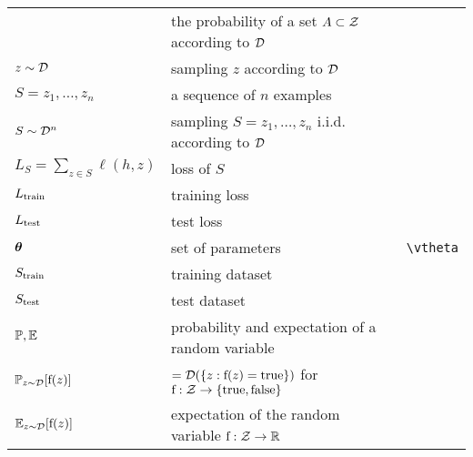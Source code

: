 \documentclass[]{report}
\begin{document}
\begin{center}
\begin{tabular}{l|l|l|l}
        & the probability of a set $A\subset \mathcal{Z}$ according to $\mathcal{D}$\\
        $z\sim\mathcal{D}$
        & sampling $z$ according to $\mathcal{D}$\\
        $S=z_1,\ldots,z_n$
        & a sequence of $n$ examples\\
        $S\sim\mathcal{D}^n$
        & sampling $S=z_1,\ldots,z_n$ i.i.d. according to $\mathcal{D}$\\
        $L_{S}=\sum_{z\in S} \ell(h,z)$  & loss of $S$ \\
        $L_{\rm train}$  & training loss \\
        $L_{\rm test}$  & test loss \\
        $\bm{\theta}$  & set of parameters  & & \verb!\vtheta! \\
        $S_{\rm train}$  & training dataset  & &   \\
        $S_{\rm test}$  & test dataset  & &   \\
        
        $\mathbb{P},\mathbb{E}$
        & probability and expectation of a random variable\\
        $\mathbb{P}_{z\sim\mathcal{D}}[\textnormal{f}(z)]$
        & $=\mathcal{D}(\{z:\textnormal{f}(z)=\mathrm{true}\})$ for $\textnormal{f}:\mathcal{Z}\to\{\mathrm{true},\mathrm{false}\}$\\
        $\mathbb{E}_{z\sim\mathcal{D}}[\textnormal{f}(z)]$
        & expectation of the random variable $\textnormal{f}:\mathcal{Z}\to\mathbb{R}$\\
        
    \end{tabular}
\end{center}
\end{document}
